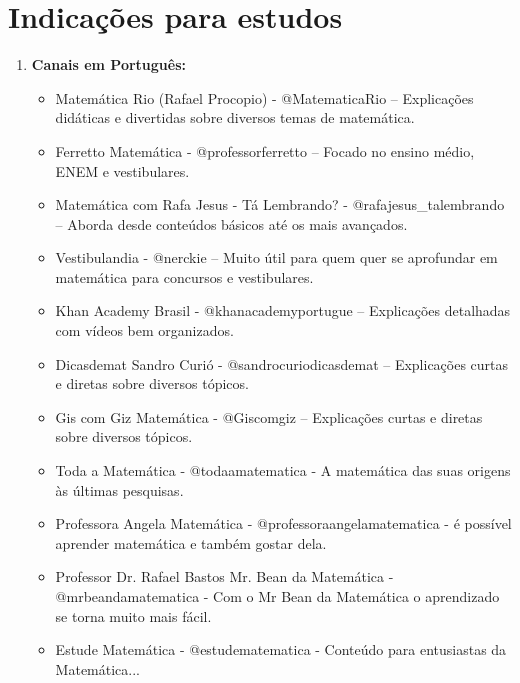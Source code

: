 \documentclass[a4paper,12pt]{article}
\begin{document}
	


\section*{Indicações para estudos}

\begin{enumerate}
	\item \textbf{Canais em Português:}
	\begin{itemize}
		\item Matemática Rio (Rafael Procopio) - @MatematicaRio – Explicações didáticas e divertidas sobre diversos temas de matemática.
		
		\item	Ferretto Matemática - @professorferretto
		– Focado no ensino médio, ENEM e vestibulares.
		
		\item Matemática com Rafa Jesus - Tá Lembrando? - @rafajesus\_talembrando
		– Aborda desde conteúdos básicos até os mais avançados.
		
		\item 	Vestibulandia - @nerckie
		– Muito útil para quem quer se aprofundar em matemática para concursos e vestibulares.
		
		\item	Khan Academy Brasil - @khanacademyportugue – Explicações detalhadas com vídeos bem organizados.
		
		\item	Dicasdemat Sandro Curió -
		@sandrocuriodicasdemat
		– Explicações curtas e diretas sobre diversos tópicos.
		
		\item Gis com Giz Matemática - @Giscomgiz – Explicações curtas e diretas sobre diversos tópicos.
		
		\item Toda a Matemática
		- @todaamatematica - A matemática das suas origens às últimas pesquisas.
		
		\item Professora Angela Matemática
		- @professoraangelamatematica
		- é possível aprender matemática e também gostar dela.
		
		\item Professor Dr. Rafael Bastos Mr. Bean da Matemática
		- @mrbeandamatematica
		- Com o Mr Bean da Matemática o aprendizado se torna muito mais fácil. 
		
		\item Estude Matemática
		- @estudematematica - Conteúdo para entusiastas da Matemática...
		

\end{itemize}
\end{enumerate}
\end{document}
